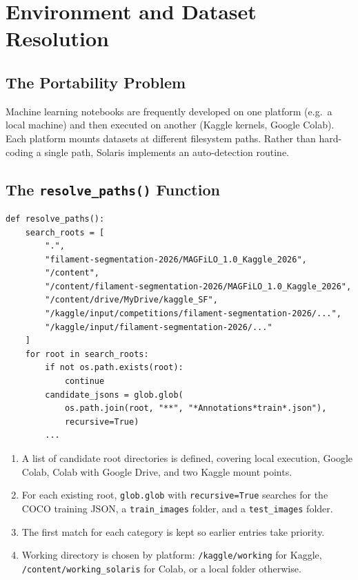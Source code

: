 \documentclass[11pt,a4paper,openany]{report}
\begin{document}
\chapter{Environment and Dataset Resolution}

\section{The Portability Problem}

Machine learning notebooks are frequently developed on one platform (e.g.\ a local machine)
and then executed on another (Kaggle kernels, Google Colab). Each platform mounts datasets
at different filesystem paths. Rather than hard-coding a single path, Solaris implements an
auto-detection routine.

\section{The \texttt{resolve\_paths()} Function}

\begin{lstlisting}[caption={Environment auto-detection},label={lst:resolve}]
def resolve_paths():
    search_roots = [
        ".",
        "filament-segmentation-2026/MAGFiLO_1.0_Kaggle_2026",
        "/content",
        "/content/filament-segmentation-2026/MAGFiLO_1.0_Kaggle_2026",
        "/content/drive/MyDrive/kaggle_SF",
        "/kaggle/input/competitions/filament-segmentation-2026/...",
        "/kaggle/input/filament-segmentation-2026/..."
    ]
    for root in search_roots:
        if not os.path.exists(root):
            continue
        candidate_jsons = glob.glob(
            os.path.join(root, "**", "*Annotations*train*.json"),
            recursive=True)
        ...
\end{lstlisting}

\begin{enumerate}
  \item A list of candidate root directories is defined, covering local execution, Google Colab,
        Colab with Google Drive, and two Kaggle mount points.
  \item For each existing root, \texttt{glob.glob} with \texttt{recursive=True} searches for the COCO
        training JSON, a \texttt{train\_images} folder, and a \texttt{test\_images} folder.
  \item The first match for each category is kept so earlier entries take priority.
  \item Working directory is chosen by platform: \texttt{/kaggle/working} for Kaggle,
        \texttt{/content/working\_solaris} for Colab, or a local folder otherwise.
\end{enumerate}
\end{document}
